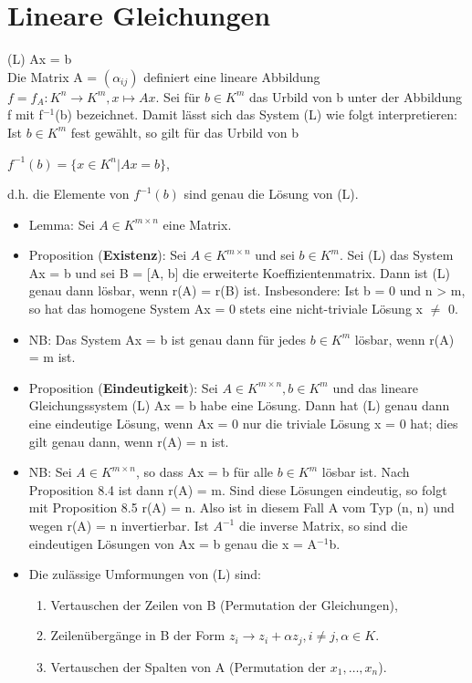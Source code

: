 \section{Lineare Gleichungen}
(L)  Ax = b\\
Die Matrix A = $(\alpha_{ij})$ definiert eine lineare Abbildung $f = f_A: K^n \to K^m, x \mapsto Ax$. Sei für $b \in K^m$ das Urbild von b unter der Abbildung f mit f$^{-1}$(b) bezeichnet. Damit lässt sich das System (L) wie folgt interpretieren: Ist $b \in K^m$ fest gewählt, so gilt für das Urbild von b
\begin{center}
$f^{-1}(b) = \{x \in K^n | Ax = b\}$,
\end{center}
d.h. die Elemente von $f^{-1}(b)$ sind genau die Lösung von (L).
\begin{itemize}
\item Lemma: Sei $A \in K^{m \times n}$ eine Matrix.
\item Proposition (\textbf{Existenz}): Sei $A \in K^{m \times n}$ und sei $b \in K^m$. Sei (L) das System Ax = b und sei B = [A, b] die erweiterte Koeffizientenmatrix. Dann ist (L) genau dann lösbar, wenn r(A) = r(B) ist. Insbesondere: Ist b = 0 und n > m, so hat das homogene System Ax = 0 stets eine nicht-triviale Lösung x $\neq$ 0.
\item NB: Das System Ax = b ist genau dann für jedes $b \in K^m$ lösbar, wenn r(A) = m ist.
\item Proposition (\textbf{Eindeutigkeit}): Sei $A \in K^{m \times n},b \in K^m$ und das lineare Gleichungssystem (L) Ax = b habe eine Lösung. Dann hat (L) genau dann eine eindeutige Lösung, wenn Ax = 0 nur die triviale Lösung x = 0 hat; dies gilt genau dann, wenn r(A) = n ist.
\item NB: Sei $A \in K^{m \times n}$, so dass Ax = b für alle $b \in K^m$ lösbar ist. Nach Proposition 8.4 ist dann r(A) = m. Sind diese Lösungen eindeutig, so folgt mit Proposition 8.5 r(A) = n. Also ist in diesem Fall A vom Typ (n, n) und wegen r(A) = n invertierbar. Ist $A^{-1}$ die inverse Matrix, so sind die eindeutigen Lösungen von Ax = b genau die x = A$^{-1}$b.
\item Die zulässige Umformungen von (L) sind:
\begin{enumerate}
\item Vertauschen der Zeilen von B (Permutation der Gleichungen),
\item Zeilenübergänge in B der Form $z_i \to z_i+\alpha z_j, i \neq j,\alpha \in K$.
\item Vertauschen der Spalten von A (Permutation der $x_1, …, x_n$).
\end{enumerate}
\end{itemize}

